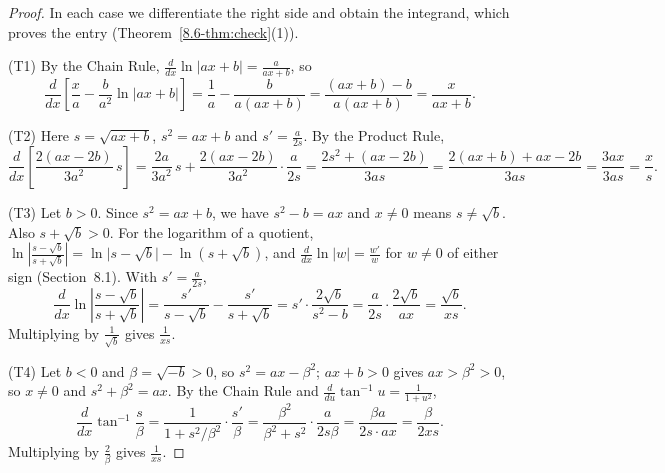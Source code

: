 \documentclass[11pt]{article}
\begin{document}
\begin{proof}
In each case we differentiate the right side and obtain the integrand, which proves the entry (Theorem~\ref{8.6-thm:check}(1)).

(T1) By the Chain Rule, $\frac d{dx}\ln\lvert ax+b\rvert=\frac a{ax+b}$, so
\[\frac d{dx}\left[\frac xa-\frac b{a^2}\ln\lvert ax+b\rvert\right]=\frac1a-\frac b{a(ax+b)}=\frac{(ax+b)-b}{a(ax+b)}=\frac x{ax+b}.\]

(T2) Here $s=\sqrt{ax+b}$, $s^2=ax+b$ and $s'=\frac a{2s}$. By the Product Rule,
\[\frac d{dx}\left[\frac{2(ax-2b)}{3a^2}\,s\right]=\frac{2a}{3a^2}\,s+\frac{2(ax-2b)}{3a^2}\cdot\frac a{2s}=\frac{2s^2+(ax-2b)}{3as}=\frac{2(ax+b)+ax-2b}{3as}=\frac{3ax}{3as}=\frac xs.\]

(T3) Let $b>0$. Since $s^2=ax+b$, we have $s^2-b=ax$ and $x\ne0$ means $s\ne\sqrt b$. Also $s+\sqrt b>0$. For the logarithm of a quotient, $\ln\left\lvert\frac{s-\sqrt b}{s+\sqrt b}\right\rvert=\ln\lvert s-\sqrt b\rvert-\ln(s+\sqrt b)$, and $\frac d{dx}\ln\lvert w\rvert=\frac{w'}w$ for $w\ne0$ of either sign (Section~8.1). With $s'=\frac a{2s}$,
\[\frac d{dx}\ln\left\lvert\frac{s-\sqrt b}{s+\sqrt b}\right\rvert=\frac{s'}{s-\sqrt b}-\frac{s'}{s+\sqrt b}=s'\cdot\frac{2\sqrt b}{s^2-b}=\frac a{2s}\cdot\frac{2\sqrt b}{ax}=\frac{\sqrt b}{xs}.\]
Multiplying by $\frac1{\sqrt b}$ gives $\frac1{xs}$.

(T4) Let $b<0$ and $\beta=\sqrt{-b}>0$, so $s^2=ax-\beta^2$; $ax+b>0$ gives $ax>\beta^2>0$, so $x\ne0$ and $s^2+\beta^2=ax$. By the Chain Rule and $\frac d{du}\tan^{-1}u=\frac1{1+u^2}$,
\[\frac d{dx}\tan^{-1}\frac s\beta=\frac1{1+s^2/\beta^2}\cdot\frac{s'}\beta=\frac{\beta^2}{\beta^2+s^2}\cdot\frac{a}{2s\beta}=\frac{\beta a}{2s\cdot ax}=\frac\beta{2xs}.\]
Multiplying by $\frac2\beta$ gives $\frac1{xs}$.


\end{proof}
\end{document}
